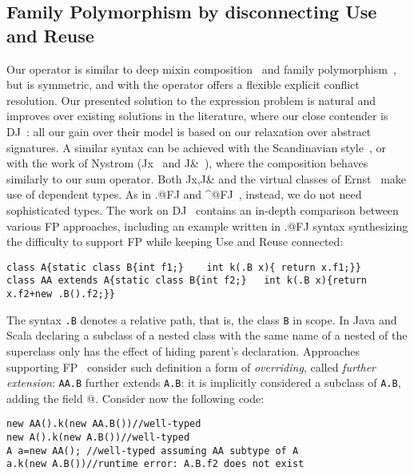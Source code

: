 \subsection{Family
Polymorphism by disconnecting Use and Reuse}
\saveSpace
Our \Q@Use@ operator is similar to deep mixin composition~\cite{ernst99a,Zenger-Odersky2005, Hutchins06}
and family polymorphism~\cite{Ernst06, igarashi2005lightweight, IgarashiViroli07, IgarashiEtAl08}, but is symmetric, and with the operator
\Q@super@ offers a flexible  explicit conflict resolution.
Our presented solution to the expression problem is
natural and improves over existing solutions in the literature, where our close contender is DJ~\cite{deep}: all our gain over their model is based on our relaxation over abstract signatures.
A similar syntax can be achieved with the Scandinavian style~\cite{ernst2004expression}, or with the work of 
Nystrom (Jx~\cite{NystromEtAl04} and
J\&~\cite{nystrom2006j}), where the composition behaves similarly to our sum operator.
Both Jx,J\& and the virtual classes of Ernst~\cite{Ernst06}
make use of dependent types.
As in \Q@.@FJ and \Q@^@FJ~\cite{igarashi2005lightweight,IgarashiEtAl08,IgarashiViroli07,saito2008essence},
 instead, we do not need sophisticated types. 
The work on DJ~\cite{deep} contains an in-depth comparison between various FP approaches, including an example written in \Q@.@FJ syntax synthesizing the difficulty to support FP while keeping Use and Reuse connected:
\saveSpace\saveSpace
\begin{lstlisting}
class A{static class B{int f1;}    int k(.B x){ return x.f1;}}
class AA extends A{static class B{int f2;}   int k(.B x){return x.f2+new .B().f2;}}
\end{lstlisting}\saveSpace\saveSpace
The syntax \lstinline{.B} denotes a relative path, that is, the 
class \lstinline{B} in scope.
In Java and Scala declaring a subclass of a nested class with the same
name of a nested of the superclass only has the effect of hiding parent's declaration.
Approaches supporting FP~\cite{igarashi2005lightweight,IgarashiEtAl08,nystrom2006j,Ernst06,BruceEtAl98,IgarashiViroli07,deep}
consider such definition a form of \emph{overriding},
called \emph{further extension}:
\lstinline{AA.B} further extends \lstinline{A.B}: it is implicitly considered a subclass of \lstinline{A.B}, adding the field @.
Consider now the following code:
\saveSpace\saveSpace\begin{lstlisting}
new AA().k(new AA.B())//well-typed
new A().k(new A.B())//well-typed
A a=new AA(); //well-typed assuming AA subtype of A
a.k(new A.B())//runtime error: A.B.f2 does not exist
\end{lstlisting}\saveSpace\saveSpace
